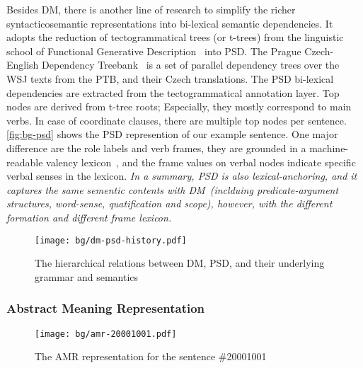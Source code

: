  Besides DM, there is another
line of research to simplify the richer syntacticosemantic
representations into bi-lexical semantic dependencies.  It adopts the
reduction of tectogrammatical trees (or t-trees) from the linguistic
school of Functional Generative
Description~\citep[FGD,][]{Sga:Haj:Pan:86,hajic2012announcing} into
PSD. The Prague Czech-English Dependency
Treebank~\citep[PCEDT,][]{hajic2012announcing} is a set of parallel
dependency trees over the WSJ texts from the PTB, and their Czech
translations. The PSD bi-lexical dependencies are extracted from the
tectogrammatical annotation layer. Top nodes are derived from t-tree
roots; Especially, they mostly correspond to main verbs. In case of
coordinate clauses, there are multiple top nodes per
sentence. \autoref{fig:bg-psd} shows the PSD represention of our
example sentence. One major difference are the role labels and verb
frames, they are grounded in a machine-readable valency
lexicon~\citep{urevsova2016czengvallex}, and the frame values on
verbal nodes indicate specific verbal senses in the lexicon. \textit{In a
summary, PSD is also lexical-anchoring, and it captures the same
sementic contents with DM~(inclduing predicate-argument structures,
word-sense, quatification and scope), however, with the different
formation and different frame lexicon.}

\begin{figure}[!th]
  \centering
  \texttt{[image: bg/dm-psd-history.pdf]}
\caption{\label{fig:dm-psd-history}The hierarchical relations between
  DM, PSD, and their underlying grammar and semantics}
\end{figure}


\subsubsection{Abstract Meaning Representation}
\label{ssec:bg:amr}
%
\begin{figure}[!th]
\centering
\texttt{[image: bg/amr-20001001.pdf]}
\caption{\label{fig:bg-amr} The AMR representation for the sentence
  \#20001001}
\end{figure}

